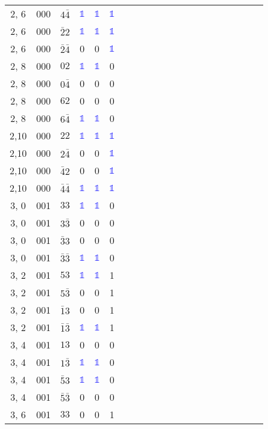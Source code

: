 \begin{longtable*}{c| cccccccccccccccccccc }
2, 6& 000& $4\bar{4}$& \textcolor{blue}{$\mathds{1}$}& \textcolor{blue}{$\mathds{1}$}& \textcolor{blue}{$\mathds{1}$}\\
2, 6& 000& $\bar{2}2$& \textcolor{blue}{$\mathds{1}$}& \textcolor{blue}{$\mathds{1}$}& \textcolor{blue}{$\mathds{1}$}\\
2, 6& 000& $\bar{2}\bar{4}$& 0& 0& \textcolor{blue}{$\mathds{1}$}\\
2, 8& 000& $02$& \textcolor{blue}{$\mathds{1}$}& \textcolor{blue}{$\mathds{1}$}& 0\\
2, 8& 000& $0\bar{4}$& 0& 0& 0\\
2, 8& 000& $62$& 0& 0& 0\\
2, 8& 000& $6\bar{4}$& \textcolor{blue}{$\mathds{1}$}& \textcolor{blue}{$\mathds{1}$}& 0\\
2,10& 000& $22$& \textcolor{blue}{$\mathds{1}$}& \textcolor{blue}{$\mathds{1}$}& \textcolor{blue}{$\mathds{1}$}\\
2,10& 000& $2\bar{4}$& 0& 0& \textcolor{blue}{$\mathds{1}$}\\
2,10& 000& $\bar{4}2$& 0& 0& \textcolor{blue}{$\mathds{1}$}\\
2,10& 000& $\bar{4}\bar{4}$& \textcolor{blue}{$\mathds{1}$}& \textcolor{blue}{$\mathds{1}$}& \textcolor{blue}{$\mathds{1}$}\\
3, 0& 001& $33$& \textcolor{blue}{$\mathds{1}$}& \textcolor{blue}{$\mathds{1}$}& 0\\
3, 0& 001& $3\bar{3}$& 0& 0& 0\\
3, 0& 001& $\bar{3}3$& 0& 0& 0\\
3, 0& 001& $\bar{3}\bar{3}$& \textcolor{blue}{$\mathds{1}$}& \textcolor{blue}{$\mathds{1}$}& 0\\
3, 2& 001& $53$& \textcolor{blue}{$\mathds{1}$}& \textcolor{blue}{$\mathds{1}$}& 1\\
3, 2& 001& $5\bar{3}$& 0& 0& 1\\
3, 2& 001& $\bar{1}3$& 0& 0& 1\\
3, 2& 001& $\bar{1}\bar{3}$& \textcolor{blue}{$\mathds{1}$}& \textcolor{blue}{$\mathds{1}$}& 1\\
3, 4& 001& $13$& 0& 0& 0\\
3, 4& 001& $1\bar{3}$& \textcolor{blue}{$\mathds{1}$}& \textcolor{blue}{$\mathds{1}$}& 0\\
3, 4& 001& $\bar{5}3$& \textcolor{blue}{$\mathds{1}$}& \textcolor{blue}{$\mathds{1}$}& 0\\
3, 4& 001& $\bar{5}\bar{3}$& 0& 0& 0\\
3, 6& 001& $33$& 0& 0& 1\\

\end{longtable*}
